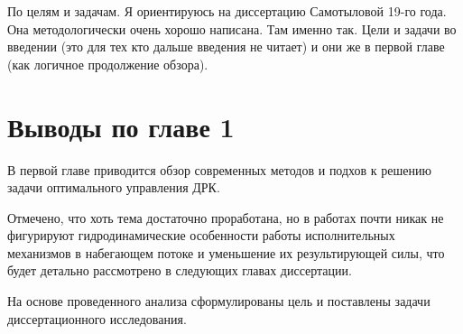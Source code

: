 \begin{notequestion}
    По целям и задачам. Я ориентируюсь на диссертацию Самотыловой 19-го года. Она методологически очень хорошо написана. Там именно так. Цели и задачи во введении (это для тех кто дальше введения не читает) и они же в первой главе (как логичное продолжение обзора).
\end{notequestion}

\section{Выводы по главе 1}\label{sec:Statement/Conclusion}
В первой главе приводится обзор современных методов и подхов к решению задачи оптимального управления ДРК.

Отмечено, что хоть тема достаточно проработана, но в работах почти никак не фигурируют гидродинамические особенности работы исполнительных механизмов в набегающем потоке и уменьшение их результирующей силы, что будет детально рассмотрено в следующих главах диссертации.

На основе проведенного анализа сформулированы цель и поставлены задачи диссертационного исследования.

